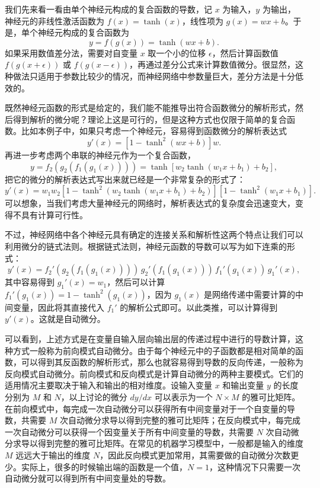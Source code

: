 我们先来看一看由单个神经元构成的复合函数的导数，记 $x$ 为输入，$y$ 为输出，神经元的非线性激活函数为 $f(x)=\tanh(x)$，线性项为 $g(x)=wx+b$。于是，单个神经元构成的复合函数为
\begin{equation}
y=f(g(x))=\tanh(wx+b).
\tag{8.3.7}
\end{equation}
如果采用数值差分法，需要对自变量 $x$ 取一个小的位移 $\epsilon$，然后计算函数值 $f(g(x+\epsilon))$ 或 $f(g(x-\epsilon))$，再通过差分公式来计算数值微分。很显然，这种做法只适用于参数比较少的情况，而神经网络中参数量巨大，差分方法是十分低效的。

既然神经元函数的形式是给定的，我们能不能推导出符合函数微分的解析形式，然后得到解析的微分呢？理论上这是可行的，但是这种方式也仅限于简单的复合函数。比如本例子中，如果只考虑一个神经元，容易得到函数微分的解析表达式
\begin{equation}
y'(x)=[1-\tanh^2(wx+b)]w.
\tag{8.3.8}
\end{equation}
再进一步考虑两个串联的神经元作为一个复合函数，
\begin{equation}
y=f_2(g_2(f_1(g_1(x))))=\tanh[w_2\tanh(w_1x+b_1)+b_2],
\tag{8.3.9}
\end{equation}
把它的微分的解析表达式写出来就已经是一个非常复杂的形式了：
\begin{equation}
y'(x)=w_1w_2[1-\tanh^2(w_2\tanh(w_1x+b_1)+b_2)][1-\tanh^2(w_1x+b_1)].
\tag{8.3.10}
\end{equation}
可以想象，当我们考虑大量神经元的网络时，解析表达式的复杂度会迅速变大，变得不具有计算可行性。

不过，神经网络中各个神经元具有确定的连接关系和解析性这两个特点让我们可以利用微分的链式法则。根据链式法则，神经元函数的导数可以写为如下连乘的形式：
\begin{equation}
y'(x)=f_2'(g_2(f_1(g_1(x))))\,g_2'(f_1(g_1(x)))\,f_1'(g_1(x))\,g_1'(x),
\tag{8.3.11}
\end{equation}
其中容易得到 $g_1'(x)=w_1$，然后可以计算 $f_1'(g_1(x))=1-\tanh^2(g_1(x))$，因为 $g_1(x)$ 是网络传递中需要计算的中间变量，因此将其直接代入 $f_1'$ 的解析公式即可。以此类推，可以计算得到 $y'(x)$。这就是自动微分。

可以看到，上述方式是在变量自输入层向输出层的传递过程中进行的导数计算，这种方式一般称为前向模式自动微分。由于每个神经元中的子函数都是相对简单的函数，可以得到其反函数的解析形式，那么也就容易得到导数的反向传递，一般称为反向模式自动微分。前向模式和反向模式是计算自动微分的两种主要模式。它们的适用情况主要取决于输入和输出的相对维度。设输入变量 $x$ 和输出变量 $y$ 的长度分别为 $M$ 和 $N$，以上讨论的微分 $dy/dx$ 可以表示为一个 $N\times M$ 的雅可比矩阵。在前向模式中，每完成一次自动微分可以获得所有中间变量对于一个自变量的导数，共需要 $M$ 次自动微分求导以得到完整的雅可比矩阵；在反向模式中，每完成一次自动微分可以获得一个因变量关于所有中间变量的导数，共需要 $N$ 次自动微分求导以得到完整的雅可比矩阵。在常见的机器学习模型中，一般都是输入的维度 $M$ 远远大于输出的维度 $N$，因此反向模式更加常用，其需要做的自动微分次数更少。实际上，很多的时候输出端的函数是一个值，$N=1$，这种情况下只需要一次自动微分就可以得到所有中间变量处的导数。

